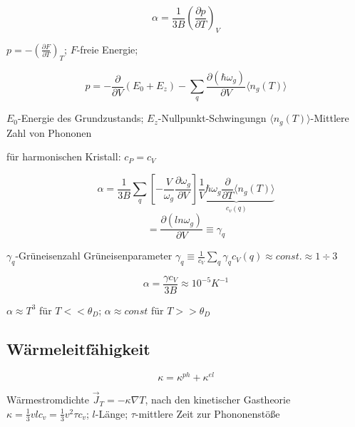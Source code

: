 \[\boxed{\alpha = \frac{1}{3B}\left( \frac{\partial p}{\partial T}\right)_V }\]


\( p = - \left( \frac{\partial F}{\partial T}\right)_T\); \(F\)-freie Energie;

 \[ p = -\frac{\partial}{\partial V}(E_0+E_z) -\sum_q\frac{\partial(\hbar \omega_g)}{\partial V}\langle n_g(T)\rangle\] 


\(E_0\)-Energie des Grundzustands; \(E_z\)-Nullpunkt-Schwingungn \(\langle n_g(T)\rangle\)-Mittlere Zahl von Phononen

für harmonischen Kristall: \(c_P=c_V\)

 
\[\alpha = \frac{1}{3B}\sum_q\left[-\frac{V}{\omega_g}\frac{\partial \omega_g}{\partial V}  \right]\underbrace{\frac{1}{V}\hbar \omega_g\frac{\partial}{\partial T}\langle n_g(T)\rangle}_{c_v(q)}\]
\[ = \frac{\partial(ln\omega_g)}{\partial V} \equiv \gamma_q\]

\(\gamma_q\)-Grüneisenzahl
Grüneisenparameter \(\gamma_q\equiv \frac{1}{c_V}\sum_q\gamma_qc_V(q)\approx const. \approx 1\div 3\)

\[\boxed{\alpha = \frac{\gamma c_V}{3B}\approx 10^{-5}K^{-1}}\]

\(\alpha\approx T^3\) für \(T<<\theta_D\); \(\alpha\approx const\) für \(T>>\theta_D\)

\subsection{Wärmeleitfähigkeit}

\[ \kappa = \kappa^{ph}+\kappa^{el}\]

Wärmestromdichte \(\vec J_T = -\kappa\nabla T\), nach den kinetischer Gastheorie \(\kappa = \frac{1}{3}vlc_v = \frac{1}{3}v^2\tau c_v\); \(l\)-Länge; \(\tau\)-mittlere Zeit zur Phononenstöße




